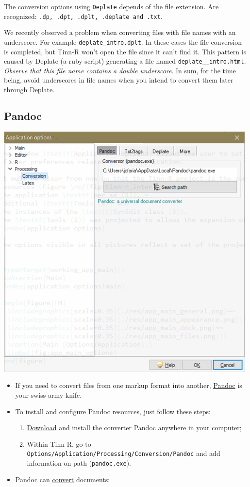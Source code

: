 The conversion options using \texttt{Deplate} depends of the file extension.
Are recognized: \texttt{.dp, .dpt, .dplt, .deplate and .txt}.

We recently observed a problem when converting files with file names with an
underscore. For example \texttt{deplate\_intro.dplt}. In these cases the file
conversion is completed, but Tinn-R won't open the file since it can't find it.
This pattern is caused by Deplate (a ruby script) generating a file named
\texttt{deplate\_\_intro.html}. \textit{Observe that this file name contains a
double underscore}. In sum, for the time being, avoid underscores in file
names when you intend to convert them later through Deplate.


\subsection{Pandoc}

\includegraphics[scale=1]{./res/app_processing_conversion_pandoc.png}

\begin{itemize}
\item If you need to convert files from one markup format into another, \href{http://johnmacfarlane.net/pandoc/index.html}{Pandoc} is your swiss-army knife.
\item To install and configure Pandoc resources, just follow these steps:
 \begin{enumerate}
 \item \href{http://code.google.com/p/pandoc/downloads/list}{Download} and install the converter Pandoc anywhere in your computer;
 \item Within Tinn-R, go to \texttt{Options/Application/Processing/Conversion/Pandoc} and add information on path (\texttt{pandoc.exe}).

 \end{enumerate}
\item Pandoc can \href{http://johnmacfarlane.net/pandoc/README.html}{convert} documents:
\end{itemize}

